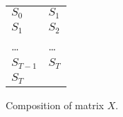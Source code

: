 \begin{figure}[t]
    \centering

    \begin{tabularx}{0.4\textwidth}{ 
  | >{\centering\arraybackslash}X 
  | >{\centering\arraybackslash}X | }
        \multicolumn{1}{c}{$S$} & \multicolumn{1}{c}{$S_\text{shift}$} \\
        \hline\hline
        $S_0$ & $S_1$ \\
        \hline
        $S_1$ & $S_2$ \\
        \hline
        \dots & \dots \\
        \hline
        $S_{T-1}$ & $S_T$ \\
        \hline
        $S_T$ & 0 \\
        \hline
    \end{tabularx}

    \caption{
        Composition of matrix $X$.
    }
    \label{fig:shift-proof}
\end{figure}